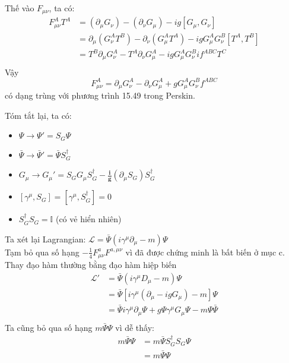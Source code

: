\documentclass[14Pt]{report}
\begin{document}
	Thế vào $F_{\mu\nu}$, ta có:
	\begin{equation}
		\begin{split}
			F_{\mu\nu}^AT^A&=(\partial_\mu G_\nu)-(\partial_\nu G_\mu)-ig\left[G_\mu,G_\nu\right]\\
			&=\partial_\mu (G_\nu^AT^B)-\partial_\nu(G_\mu^AT^A)-igG_\mu^AG_\nu^B\left[T^A,T^B\right]\\
			&=T^B\partial_\mu G_\nu^A-T^A\partial_\nu G_\mu^A-igG_\mu^AG_\nu^Bif^{ABC}T^C\\
		\end{split}
	\end{equation}
	Vậy $$	F_{\mu\nu}^A=\partial_\mu G_\nu^A-\partial_\nu G_\mu^A+gG_\mu^AG_\nu^Bf^{ABC}$$
	có dạng trùng với phương trình 15.49 trong Perskin.
	
	Tóm tắt lại, ta có:
	\begin{itemize}
		\item $\Psi\rightarrow\Psi'=S_G\Psi$
		\item $\bar{\Psi}\rightarrow\bar{\Psi}'=\bar{\Psi}S_G^\dagger$
		\item $G_\mu\rightarrow G_\mu'=S_GG_\mu S_G^\dagger-\frac{\textbf{i}}{\textbf{g}}(\partial_\mu S_G)S_G^\dagger$
		\item $\left[\gamma^\mu,S_G\right]=\left[\gamma^\mu,S_G^\dagger\right]=0$
		\item $S_G^\dagger S_G=\mathbb{I}$ (có vẻ hiển nhiên)
	\end{itemize}
	Ta xét lại Lagrangian:
	$\mathcal{L}=\bar{\Psi}(i\gamma^\mu\partial_\mu-m)\Psi$\\
	Tạm bỏ qua số hạng $-\frac{1}{4}F_{\mu\nu}^aF^{a,\mu\nu}$ vì đã được chứng minh là bất biến ở mục c.
	\\
	Thay đạo hàm thường bằng đạo hàm hiệp biến
	\begin{equation}
		\begin{split}
			\mathcal{L}'&=\bar{\Psi}(i\gamma^\mu D_\mu-m)\Psi\\
			&=\bar{\Psi}[i\gamma^\mu (\partial_\mu-igG_\mu)-m]\Psi\\
			&=\bar{\Psi}i\gamma^\mu \partial_\mu\Psi+g\Psi\gamma^\mu G_\mu\Psi-m\Psi\bar{\Psi}\\
		\end{split}
	\end{equation}
	Ta cũng bỏ qua số hạng $m\bar{\Psi}\Psi$ vì dễ thấy:
	\begin{equation}
		\begin{split}
			m\bar{\Psi}\Psi&=m\bar{\Psi}S_G^\dagger S_G\Psi\\
			&=m\bar{\Psi}\Psi
		\end{split}
	\end{equation}
\end{document}
